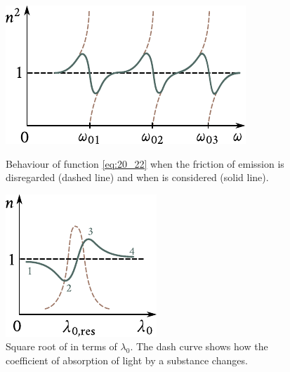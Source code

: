 \begin{figure}[t]
	\begin{minipage}[t]{0.48\linewidth}
		\begin{center}
			\includegraphics[scale=1]{figures/ch_20/fig_20_5.pdf}
            \caption[]{Behaviour of function \eqref{eq:20_22} when the friction of emission is disregarded (dashed line) and when is considered (solid line).}
			\label{fig:20_5}
		\end{center}
	\end{minipage}
	\hfill{ }%
	\begin{minipage}[t]{0.48\linewidth}
		\begin{center}
			\includegraphics[scale=1]{figures/ch_20/fig_20_6.pdf}
			\caption[]{Square root of  in terms of $\lambda_0$. The dash curve shows how the coefficient of absorption of light by a substance changes.}
			\label{fig:20_6}
		\end{center}
	\end{minipage}
\vspace{-0.4cm}
\end{figure}

